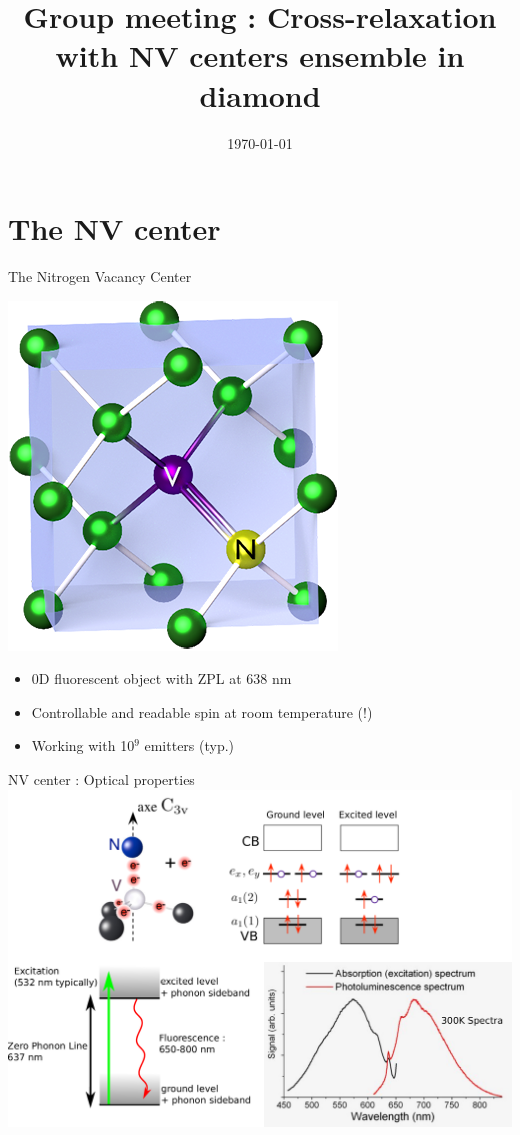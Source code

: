 \documentclass{beamer}
\title{Group meeting : Cross-relaxation with NV centers ensemble in diamond}
\date\today
\begin{document}
\begin{frame}
\maketitle
\end{frame}
\begin{frame}
\tableofcontents
\end{frame}
\section{The NV center}
\begin{frame}
\tableofcontents[currentsection]
\end{frame}
\begin{frame}{The Nitrogen Vacancy Center}
\begin{center}
\includegraphics[scale=.4]{Nitrogen-vacancy_center}
\end{center}
\begin{itemize}
\item 0D fluorescent object with ZPL at 638 nm
\item Controllable and readable spin at room temperature (!)
\item Working with 10$^9$ emitters (typ.)
\end{itemize}
\end{frame}
\begin{frame}{NV center : Optical properties}
\centering
\includegraphics[scale=.4]{slide_NV_optical}
\end{frame}
\end{document}
